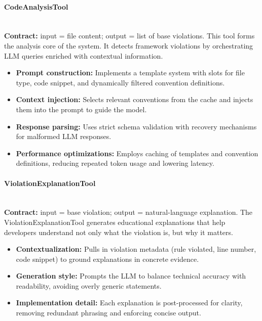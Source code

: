 \begin{spacing}{1.2}
\paragraph{CodeAnalysisTool}\\
\textbf{Contract:} input = file content; output = list of base violations.  
This tool forms the analysis core of the system. It detects framework violations by orchestrating LLM queries enriched with contextual information.
\begin{itemize}
    \item \textbf{Prompt construction:} Implements a template system with slots for file type, code snippet, and dynamically filtered convention definitions.
    \item \textbf{Context injection:} Selects relevant conventions from the cache and injects them into the prompt to guide the model.
    \item \textbf{Response parsing:} Uses strict schema validation with recovery mechanisms for malformed LLM responses.
    \item \textbf{Performance optimizations:} Employs caching of templates and convention definitions, reducing repeated token usage and lowering latency.
\end{itemize}

\paragraph{ViolationExplanationTool}\\
\textbf{Contract:} input = base violation; output = natural-language explanation.  
The ViolationExplanationTool generates educational explanations that help developers understand not only what the violation is, but why it matters.
\begin{itemize}
    \item \textbf{Contextualization:} Pulls in violation metadata (rule violated, line number, code snippet) to ground explanations in concrete evidence.
    \item \textbf{Generation style:} Prompts the LLM to balance technical accuracy with readability, avoiding overly generic statements.
    \item \textbf{Implementation detail:} Each explanation is post-processed for clarity, removing redundant phrasing and enforcing concise output.
\end{itemize}


\end{spacing}
